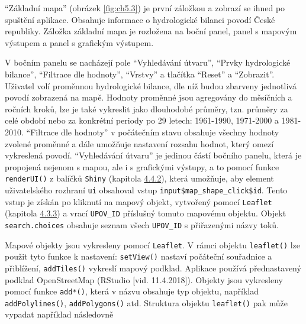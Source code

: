 \documentclass[12pt,]{article}
\newenvironment{Shaded}{\begin{snugshade}}{\end{snugshade}}
\newcommand{\KeywordTok}[1]{\textcolor[rgb]{0.13,0.29,0.53}{\textbf{#1}}}
\newcommand{\DataTypeTok}[1]{\textcolor[rgb]{0.13,0.29,0.53}{#1}}
\newcommand{\StringTok}[1]{\textcolor[rgb]{0.31,0.60,0.02}{#1}}
\newcommand{\OperatorTok}[1]{\textcolor[rgb]{0.81,0.36,0.00}{\textbf{#1}}}
\newcommand{\NormalTok}[1]{#1}
\begin{document}
\qquad \enquote{Základní mapa} (obrázek \ref{fig:ch5.3}) je první
záložkou a zobrazí se ihned po spuštění aplikace. Obsahuje informace o
hydrologické bilanci povodí České republiky. Záložka základní mapa je
rozložena na boční panel, panel s mapovým výstupem a panel s grafickým
výstupem.

\qquad V bočním panelu se nacházejí pole \enquote{Vyhledávání útvaru},
\enquote{Prvky hydrologické bilance}, \enquote{Filtrace dle hodnoty},
\enquote{Vrstvy} a tlačítka \enquote{Reset} a \enquote{Zobrazit}.
Uživatel volí proměnnou hydrologické bilance, dle níž budou zbarveny
jednotlivá povodí zobrazená na mapě. Hodnoty proměnné jsou agregovány do
měsíčních a ročních kroků, lze je také vykreslit jako dlouhodobé
průměry, tzn. průměry za celé období nebo za konkrétní periody po 29
letech: 1961-1990, 1971-2000 a 1981-2010. \enquote{Filtrace dle hodnoty}
v počátečním stavu obsahuje všechny hodnoty zvolené proměnné a dále
umožňuje nastavení rozsahu hodnot, který omezí vykreslená povodí.
\enquote{Vyhledávání útvaru} je jedinou částí bočního panelu, která je
propojená nejenom s mapou, ale i s grafickými výstupy, a to pomocí
funkce \texttt{renderUI()} z balíčků \texttt{Shiny} (kapitola
\protect\hyperlink{shiny}{4.4.2}), která umožňuje, aby element
uživatelského rozhraní \texttt{ui} obsahoval vstup
\texttt{input\$map\_shape\_click\$id}. Tento vstup je získán po kliknutí
na mapový objekt, vytvořený pomocí \texttt{Leaflet} (kapitola
\protect\hyperlink{leaflet}{4.3.3}) a vrací \texttt{UPOV\_ID} příslušný
tomuto mapovému objektu. Objekt \texttt{search.choices} obsahuje seznam
všech \texttt{UPOV\_ID} s přiřazenými názvy toků.

\begin{Shaded}
\end{Shaded}

\qquad Mapové objekty jsou vykresleny pomocí \texttt{Leaflet}. V rámci
objektu \texttt{leaflet()} lze použit tyto funkce k nastavení:
\texttt{setView()} nastaví počáteční souřadnice a přiblížení,
\texttt{addTiles()} vykreslí mapový podklad. Aplikace používá
přednastavený podklad OpenStreetMap (RStudio {[}vid. 11.4.2018{]}).
Objekty jsou vykresleny pomocí funkce \texttt{add*()}, která v názvu
obsahuje typ objektu, například \texttt{addPolylines()},
\texttt{addPolygons()} atd. Struktura objektu \texttt{leaflet()} pak
může vypadat například následovně
\end{document}
